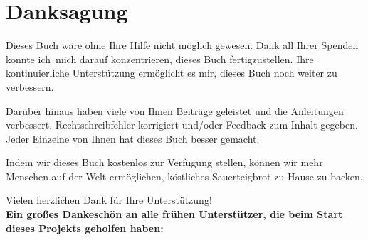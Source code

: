\chapter{Danksagung}%
\label{ch:Acknowledgments}
Dieses Buch wäre ohne Ihre Hilfe nicht möglich gewesen.
Dank all Ihrer Spenden konnte ich~mich darauf konzentrieren, dieses
Buch fertigzustellen. Ihre kontinuierliche Unterstützung ermöglicht
es mir, dieses Buch noch weiter zu verbessern.

Darüber hinaus haben viele von Ihnen Beiträge geleistet und die
Anleitungen verbessert, Rechtschreibfehler korrigiert und/oder
Feedback zum Inhalt gegeben. Jeder Einzelne von Ihnen hat dieses Buch
besser gemacht.

Indem wir dieses Buch kostenlos zur Verfügung stellen,
können wir mehr Menschen auf der Welt ermöglichen, köstliches Sauerteigbrot
zu Hause zu backen.

Vielen herzlichen Dank für Ihre Unterstützung!\\

\textbf{Ein großes Dankeschön an alle frühen Unterstützer, die beim Start
dieses Projekts geholfen haben:\\}


